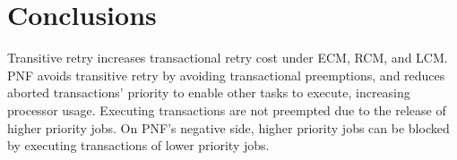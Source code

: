 \documentclass[twocolumn]{article}
\begin{document}

\section{Conclusions}\label{conclusion}

Transitive retry increases transactional retry cost under ECM, RCM, and LCM. PNF avoids transitive retry by avoiding   transactional preemptions, and reduces aborted transactions' priority to enable other tasks to execute, increasing processor usage. Executing transactions are not preempted due to the release of higher priority jobs. On PNF's negative side, higher priority jobs can be blocked by executing transactions of lower priority jobs. 



\footnotesize{}
\end{document}
